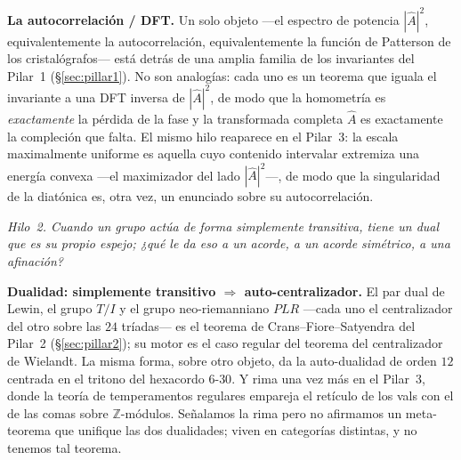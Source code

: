 \documentclass[11pt]{article}
\newcommand{\Ahat}{\hat{A}}
\newcommand{\question}[1]{\smallskip\noindent\textit{#1}\smallskip}
\begin{document}
\noindent\textbf{La autocorrelación / DFT.} Un solo objeto ---el espectro de potencia $|\Ahat|^2$,
equivalentemente la autocorrelación, equivalentemente la función de Patterson de los
cristalógrafos--- está detrás de una amplia familia de los invariantes del Pilar~1 (\S\ref{sec:pillar1}).
No son analogías: cada
uno es un teorema que iguala el invariante a una DFT inversa de $|\Ahat|^2$, de modo que la homometría es
\emph{exactamente} la pérdida de la fase y la transformada completa $\Ahat$ es exactamente la compleción
que falta. El mismo hilo reaparece en el Pilar~3: la escala maximalmente uniforme es aquella cuyo contenido
intervalar extremiza una energía convexa ---el maximizador del lado $|\Ahat|^2$---, de modo que la
singularidad de la diatónica es, otra vez, un enunciado sobre su autocorrelación.

\question{Hilo~2. Cuando un grupo actúa de forma simplemente transitiva, tiene un dual que es su propio
espejo; ¿qué le da eso a un acorde, a un acorde simétrico, a una afinación?}

\noindent\textbf{Dualidad: simplemente transitivo $\Rightarrow$ auto-centralizador.} El par dual de Lewin,
el grupo $T/I$ y el grupo neo-riemanniano $PLR$ ---cada uno el centralizador del otro sobre las $24$
tríadas--- es el teorema de Crans--Fiore--Satyendra del Pilar~2 (\S\ref{sec:pillar2}); su motor es el caso
regular del teorema del centralizador de Wielandt. La misma forma, sobre otro objeto, da la auto-dualidad
de orden $12$ centrada en el tritono del hexacordo $6$-$30$. Y rima una vez más en el Pilar~3, donde la
teoría de temperamentos regulares empareja el retículo de los vals con el de las comas sobre
$\mathbb{Z}$-módulos. Señalamos la rima pero no afirmamos un meta-teorema que unifique las dos
dualidades; viven en categorías distintas, y no tenemos tal teorema.
\end{document}
